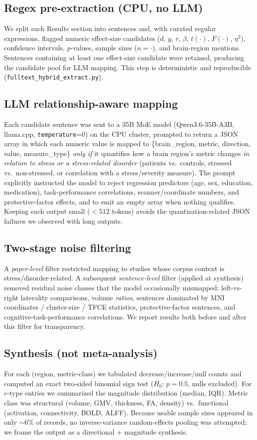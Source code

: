 \documentclass[11pt]{article}
\begin{document}
\subsection{Regex pre-extraction (CPU, no LLM)}
We split each Results section into sentences and, with curated regular
expressions, flagged numeric effect-size candidates ($d$, $g$, $r$, $\beta$,
$t(\cdot)$, $F(\cdot)$, $\eta^2$), confidence intervals, $p$-values, sample sizes
($n=\cdot$), and brain-region mentions. Sentences containing at least one
effect-size candidate were retained, producing the candidate pool for LLM
mapping. This step is deterministic and reproducible
(\texttt{fulltext\_hybrid\_extract.py}).

\subsection{LLM relationship-aware mapping}
Each candidate sentence was sent to a 35B MoE model (Qwen3.6-35B-A3B, llama.cpp,
\texttt{temperature}=0) on the CPU cluster, prompted to return a JSON array in
which each numeric value is mapped to \{brain\_region, metric, direction, value,
measure\_type\} \emph{only if} it quantifies how a brain region's metric changes
\emph{in relation to stress or a stress-related disorder} (patients vs.\
controls, stressed vs.\ non-stressed, or correlation with a stress/severity
measure). The prompt explicitly instructed the model to reject regression
predictors (age, sex, education, medication), task-performance correlations,
scanner/coordinate numbers, and protective-factor effects, and to emit an empty
array when nothing qualifies. Keeping each output small ($<512$ tokens) avoids
the quantization-related JSON failures we observed with long outputs.

\subsection{Two-stage noise filtering}
A \emph{paper-level} filter restricted mapping to studies whose corpus context is
stress/disorder-related. A subsequent \emph{sentence-level} filter (applied at
synthesis) removed residual noise classes that the model occasionally mismapped:
left-vs-right laterality comparisons, volume \emph{ratios}, sentences dominated by
MNI coordinates / cluster-size / TFCE statistics, protective-factor sentences,
and cognitive-task-performance correlations. We report results both before and
after this filter for transparency.

\subsection{Synthesis (not meta-analysis)}
For each (region, metric-class) we tabulated decrease/increase/null counts and
computed an exact two-sided binomial sign test ($H_0$: $p=0.5$, nulls excluded).
For $r$-type entries we summarized the magnitude distribution (median, IQR).
Metric class was structural (volume, GMV, thickness, FA, density) vs.\ functional
(activation, connectivity, BOLD, ALFF). Because usable sample sizes appeared in
only $\sim$6\% of records, no inverse-variance random-effects pooling was
attempted; we frame the output as a directional + magnitude synthesis.
\end{document}
